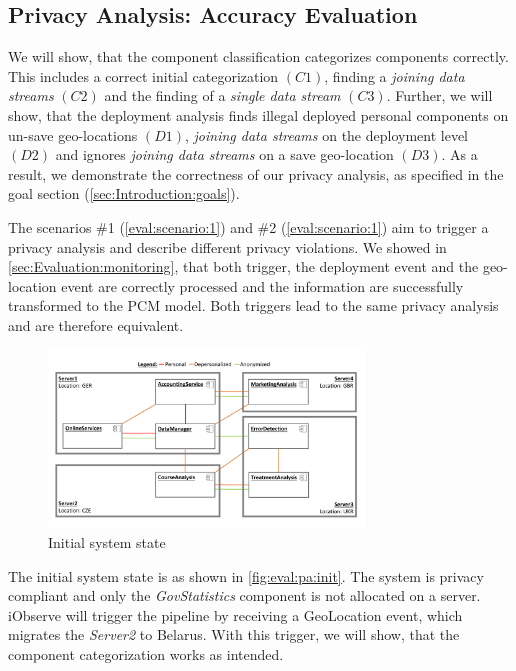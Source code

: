 \subsection{Privacy Analysis: Accuracy Evaluation}

We will show, that the component classification categorizes components correctly. This includes a correct initial categorization $(C1)$, finding a \textit{joining data streams} $(C2)$ and the finding of a \textit{single data stream} $(C3)$. Further, we will show, that the deployment analysis finds illegal deployed personal components on un-save geo-locations $(D1)$, \textit{joining data streams} on the deployment level $(D2)$ and ignores \textit{joining data streams} on a save geo-location $(D3)$. As a result, we demonstrate the correctness of our privacy analysis, as specified in the goal section (\autoref{sec:Introduction:goals}).

The scenarios \#1 (\autoref{eval:scenario:1}) and \#2 (\autoref{eval:scenario:1}) aim to trigger a privacy analysis and describe different privacy violations. We showed in \autoref{sec:Evaluation:monitoring}, that both trigger, the deployment event and the geo-location event are correctly processed and the information are successfully transformed to the PCM model. Both triggers lead to the same privacy analysis and are therefore equivalent. 


\begin{figure}[h]
	\centering
	\includegraphics[trim = 0mm 10mm 0mm 10mm, clip, width=0.75\textwidth]{graphs/medSys_eval_pa_init}
	\caption{Initial system state}
	\label{fig:eval:pa:init}
\end{figure}

The initial system state is as shown in \autoref{fig:eval:pa:init}. The system is privacy compliant and only the \textit{GovStatistics} component is not allocated on a server. iObserve will trigger the pipeline by receiving a GeoLocation event, which migrates the \textit{Server2} to Belarus. With this trigger, we will show, that the component categorization works as intended.

